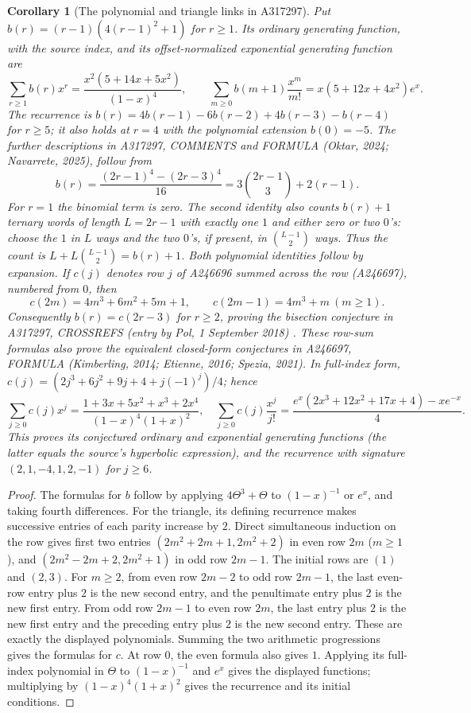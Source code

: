 \documentclass[11pt]{article}
\newtheorem{corollary}[theorem]{Corollary}
\begin{document}
\begin{corollary}[The polynomial and triangle links in A317297]\label{triangle}
Put $b(r)=(r-1)(4(r-1)^2+1)$ for $r\geq1$. Its ordinary generating
function, with the source index, and its offset-normalized exponential
generating function are
\[
 \sum_{r\geq1}b(r)x^r=\frac{x^2(5+14x+5x^2)}{(1-x)^4},\qquad
 \sum_{m\geq0}b(m+1)\frac{x^m}{m!}=x(5+12x+4x^2)e^x.
\]
The recurrence is $b(r)=4b(r-1)-6b(r-2)+4b(r-3)-b(r-4)$ for $r\geq5$;
it also holds at $r=4$ with the polynomial extension $b(0)=-5$.
The further descriptions in A317297, COMMENTS and FORMULA (Oktar, 2024;
Navarrete, 2025), follow from
\[
 b(r)=\frac{(2r-1)^4-(2r-3)^4}{16}
     =3\binom{2r-1}{3}+2(r-1).
\]
For $r=1$ the binomial term is zero. The second identity also counts
$b(r)+1$ ternary words of length $L=2r-1$ with exactly one $1$ and
either zero or two $0$'s: choose the $1$ in $L$ ways and the two $0$'s,
if present, in $\binom{L-1}{2}$ ways. Thus the count is
$L+L\binom{L-1}{2}=b(r)+1$. Both polynomial identities follow by expansion.
If $c(j)$ denotes row $j$ of A246696 summed across the row (A246697),
numbered from $0$, then
\[
 c(2m)=4m^3+6m^2+5m+1,\qquad c(2m-1)=4m^3+m\ (m\geq1).
\]
Consequently $b(r)=c(2r-3)$ for $r\geq2$, proving the bisection
conjecture in A317297, CROSSREFS (entry by Pol, 1 September 2018) \cite{trianglelinks}.
These row-sum formulas also prove the equivalent closed-form conjectures
in A246697, FORMULA (Kimberling, 2014; Etienne, 2016; Spezia, 2021).
In full-index form, $c(j)=(2j^3+6j^2+9j+4+j(-1)^j)/4$; hence
\[
 \sum_{j\geq0}c(j)x^j=\frac{1+3x+5x^2+x^3+2x^4}{(1-x)^4(1+x)^2},\quad
 \sum_{j\geq0}c(j)\frac{x^j}{j!}
 =\frac{e^x(2x^3+12x^2+17x+4)-xe^{-x}}4.
\]
This proves its conjectured ordinary and exponential generating functions
(the latter equals the source's hyperbolic expression), and the recurrence
with signature $(2,1,-4,1,2,-1)$ for $j\geq6$.
\end{corollary}
\begin{proof}
The formulas for $b$ follow by applying
$4\Theta^3+\Theta$ to $(1-x)^{-1}$ or $e^x$, and taking fourth differences.
For the triangle, its defining recurrence makes successive entries of
each parity increase by $2$. Direct simultaneous induction on the row
gives first two entries $(2m^2+2m+1,2m^2+2)$ in even row $2m$ ($m\geq1$),
and $(2m^2-2m+2,2m^2+1)$ in odd row $2m-1$.
The initial rows are $(1)$ and $(2,3)$.
For $m\geq2$, from even row $2m-2$ to odd row $2m-1$, the last even-row
entry plus $2$ is the new second entry, and the penultimate entry plus $2$
is the new first entry. From odd row $2m-1$ to even row $2m$, the last
entry plus $2$ is the new first entry and the preceding entry plus $2$
is the new second entry. These are exactly the displayed polynomials.
Summing the two arithmetic progressions gives the formulas for $c$.
At row $0$, the even formula also gives $1$.
Applying its full-index polynomial in $\Theta$ to $(1-x)^{-1}$ and $e^x$
gives the displayed functions; multiplying by $(1-x)^4(1+x)^2$
gives the recurrence and its initial conditions.
\end{proof}
\end{document}
